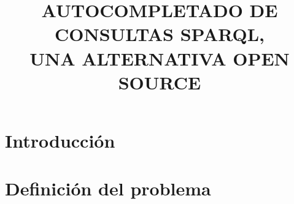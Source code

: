 \documentclass[conference,compsoc]{IEEEtran}
\begin{document}
\title{AUTOCOMPLETADO DE CONSULTAS SPARQL,\\UNA ALTERNATIVA OPEN SOURCE}

\author{
}

\maketitle

\IEEEpubidadjcol

\begin{abstract}
\end{abstract}

\begin{IEEEkeywords}
\end{IEEEkeywords}

\IEEEpeerreviewmaketitle

\section{Introducción}

\section{Definición del problema}
\end{document}
